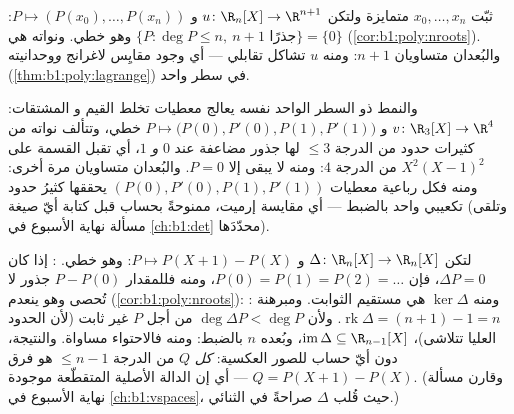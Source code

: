 \begin{example}\label{ex:b1:linmaps:interpolation}
ثبّت $x_0, \dots, x_n$ متمايزة ولتكن $u \colon \R_n[X] \to
\R^{n+1}$ و $P \mapsto (P(x_0), \dots, P(x_n))$: وهو خطي. ونواته
هي $\{P : \deg P \leq n,\ n+1 \text{ جذرًا}\} = \{0\}$
(\cref{cor:b1:poly:nroots}). والبُعدان متساويان $n + 1$: ومنه  $u$
تشاكل تقابلي --- أي وجود مقايِس لاغرانج \emph{و}وحدانيته
(\cref{thm:b1:poly:lagrange}) في سطر واحد.

والنمط ذو السطر الواحد نفسه يعالج معطيات تخلط القيم و
المشتقات:  $v \colon \R_3[X] \to \R^4$ و $P \mapsto \bigl(P(0),
P'(0), P(1), P'(1)\bigr)$ خطي، وتتألف نواته من
كثيرات حدود من الدرجة $\leq 3$ لها جذور مضاعفة عند $0$ \emph{و}
$1$، أي تقبل القسمة على $X^2(X-1)^2$ من الدرجة $4$: ومنه لا يبقى إلا $P =
0$. والبُعدان متساويان مرة أخرى: ومنه فكل رباعية معطيات $(P(0),
P'(0), P(1), P'(1))$ يحققها كثيرُ حدود تكعيبي واحد بالضبط ---
أي مقايسة إرميت، ممنوحةً بحساب  قبل
كتابة أيّ صيغة (وتلقى مسألة نهاية الأسبوع في \cref{ch:b1:det}
محدّدَها).
\end{example}

\begin{example}
\label{ex:b1:linmaps:delta}
لتكن $\Delta \colon \R_n[X] \to \R_n[X]$ و $P \mapsto P(X+1) -
P(X)$: وهو خطي. : إذا كان $\Delta P = 0$، فإن $P(0) = P(1) =
P(2) = \dots$، ومنه فللمقدار $P - P(0)$ جذور لا تُحصى وهو
ينعدم (\cref{cor:b1:poly:nroots}): ومنه  $\ker\Delta$ هي مستقيم
الثوابت. ومبرهنة : $\operatorname{rk}\Delta = (n + 1) - 1
= n$. ولأن $\deg \Delta P < \deg P$ من أجل $P$ غير ثابت (لأن الحدود
العليا تتلاشى)، $\operatorname{im}\Delta \subseteq \R_{n-1}[X]$،
وبُعده $n$ بالضبط: ومنه فالاحتواء مساواة.
والنتيجة، دون أيّ حساب للصور العكسية: \emph{كل}
 $Q$ من الدرجة $\leq n - 1$ هو فرق $Q = P(X+1)
- P(X)$ --- أي إن الدالة الأصلية المتقطّعة موجودة. (وقارن
مسألة نهاية الأسبوع في \cref{ch:b1:vspaces}، حيث قُلب $\Delta$
صراحةً في  الثنائي.)
\end{example}

